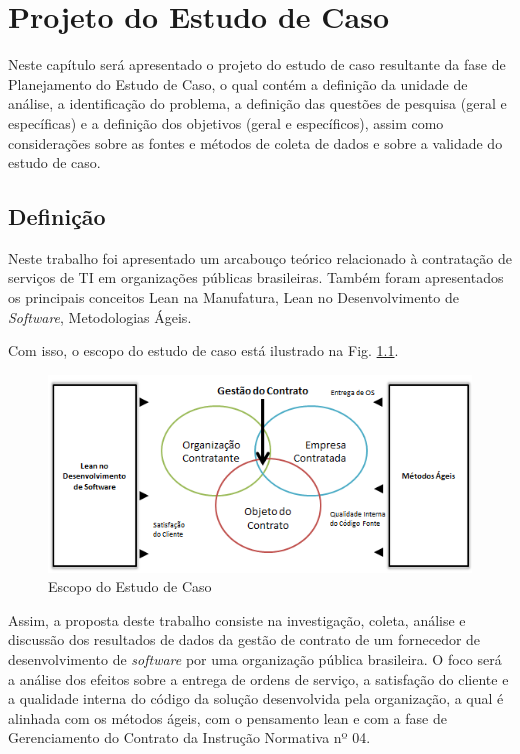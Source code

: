 \chapter[Projeto do Estudo de Caso]{Projeto do Estudo de Caso}

Neste capítulo será apresentado o projeto do estudo de caso resultante da fase de Planejamento do Estudo de Caso, o qual contém a definição da unidade de análise,  a identificação do problema, a definição das questões de pesquisa (geral e específicas) e a definição dos objetivos (geral e específicos), assim como considerações sobre as fontes e métodos de coleta de dados e sobre a validade do estudo de caso.

\section[Definição]{Definição}

Neste trabalho foi apresentado um arcabouço teórico relacionado à contratação de serviços de TI em organizações públicas brasileiras. Também foram apresentados os principais conceitos Lean na Manufatura, Lean no Desenvolvimento de \textit{Software}, Metodologias Ágeis.

Com isso, o escopo do estudo de caso está ilustrado na Fig. \ref{escopo}. 
\begin{figure}[H]
		\centering
		
			\includegraphics[scale=1.0]{figuras/escopoEC.png}
		
		\caption{Escopo do Estudo de Caso}
		\label{escopo}
		
\end{figure}

Assim, a proposta deste trabalho consiste na investigação, coleta, análise e discussão dos resultados de dados da gestão de contrato de um fornecedor de desenvolvimento de \textit{software} por uma organização pública brasileira. O foco será a análise dos efeitos sobre a entrega de ordens de serviço,  a satisfação do cliente e a qualidade interna do código da solução desenvolvida pela organização, a qual é alinhada com os métodos ágeis, com o pensamento lean e com a fase de Gerenciamento do Contrato da Instrução Normativa nº 04.


